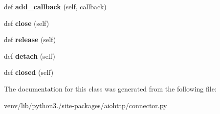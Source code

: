 \begin{DoxyCompactItemize}
\mbox{\label{classaiohttp_1_1connector_1_1_connection_a6fc1a70ae7e5d9f7fc8c4671d43765d4}} 
def {\bfseries add\+\_\+callback} (self, callback)
\item 
\mbox{\label{classaiohttp_1_1connector_1_1_connection_a06f74d92df120aa9730589b76be1010b}} 
def {\bfseries close} (self)
\item 
\mbox{\label{classaiohttp_1_1connector_1_1_connection_a005d380bcbbeefab2fbb5548c2483a24}} 
def {\bfseries release} (self)
\item 
\mbox{\label{classaiohttp_1_1connector_1_1_connection_a432f01fe196bc63b437d1de6c64b61e3}} 
def {\bfseries detach} (self)
\item 
\mbox{\label{classaiohttp_1_1connector_1_1_connection_afcff4a5ad71d08fed8c7603d9617ee47}} 
def {\bfseries closed} (self)
\end{DoxyCompactItemize}


The documentation for this class was generated from the following file\+:\begin{DoxyCompactItemize}
\item 
venv/lib/python3./site-\/packages/aiohttp/connector.\+py\end{DoxyCompactItemize}

